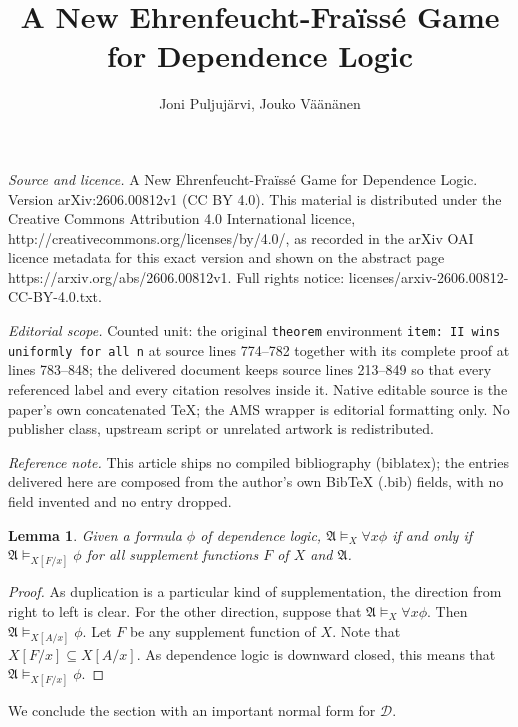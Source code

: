 \documentclass[10pt,a4paper]{amsart}
\newtheorem{lemma}[definition]{Lemma}
\newcommand{\A}{\mathfrak{A}}
\newcommand{\deplog}{\mathcal D}
\begin{document}
\title[A New Ehrenfeucht-Fra"iss'e Game for Dependence Logic]{A New Ehrenfeucht-Fra\"iss\'e Game for Dependence Logic}
\author{Joni Puljujärvi, Jouko Väänänen}
\date{}
\maketitle
\noindent\emph{Source and licence.} A New Ehrenfeucht-Fra\"iss\'e Game for Dependence Logic. Version arXiv:2606.00812v1 (CC BY 4.0). This material is distributed under the Creative Commons Attribution 4.0 International licence, http://creativecommons.org/licenses/by/4.0/, as recorded in the arXiv OAI licence metadata for this exact version and shown on the abstract page https://arxiv.org/abs/2606.00812v1. Full rights notice: licenses/arxiv-2606.00812-CC-BY-4.0.txt.\par\smallskip
\noindent\textit{Editorial scope.} Counted unit: the original \texttt{theorem} environment \texttt{item: II wins uniformly for all n} at source lines 774--782 together with its complete proof at lines 783--848; the delivered document keeps source lines 213--849 so that every referenced label and every citation resolves inside it. Native editable source is the paper's own concatenated TeX; the AMS wrapper is editorial formatting only. No publisher class, upstream script or unrelated artwork is redistributed.
\par\smallskip\noindent\textit{Reference note.} This article ships no compiled bibliography (biblatex); the entries delivered here are composed from the author's own BibTeX (.bib) fields, with no field invented and no entry dropped.
\begin{lemma}\label{lemma: alt semantics for universal quantifier}
    Given a formula $\phi$ of dependence logic, $\A\models_X\forall x\phi$ if and only if $\A\models_{X[F/x]}\phi$ for all supplement functions $F$ of $X$ and $\A$.
\end{lemma}
\begin{proof}
    As duplication is a particular kind of supplementation, the direction from right to left is clear. For the other direction, suppose that $\A\models_X\forall x\phi$. Then $\A\models_{X[A/x]}\phi$. Let $F$ be any supplement function of $X$. Note that $X[F/x]\subseteq X[A/x]$. As dependence logic is downward closed, this means that $\A\models_{X[F/x]}\phi$.
\end{proof}

We conclude the section with an important normal form for $\deplog$.
\end{document}
